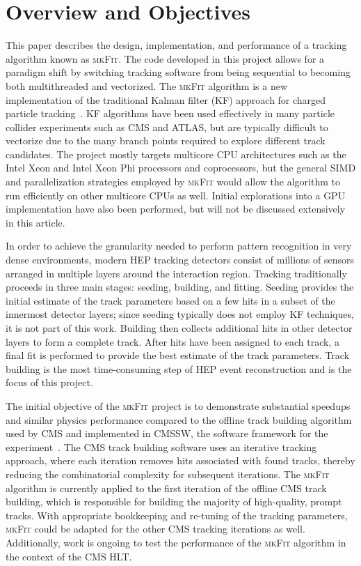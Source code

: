 \documentclass[a4paper,11pt]{article}
\newcommand{\mkFit}{\textsc{mkFit}\xspace}
\newcommand{\Intel}{Intel\textregistered\xspace}
\newcommand{\Xeon}{Xeon\textregistered\xspace}
\newcommand{\XeonPhi}{Xeon Phi\texttrademark\xspace}
\begin{document}

\section{Overview and Objectives}

This paper describes the design, implementation, and performance of a tracking algorithm known as \mkFit. 
The code developed in this project %
allows for a paradigm shift by switching tracking software from being sequential to becoming both multithreaded and vectorized. 
The \mkFit algorithm is a new implementation of the traditional Kalman filter (KF) approach for charged particle tracking~\cite{Fruhwirth:1987fm}. KF algorithms have been used effectively in many particle collider experiments such as CMS and ATLAS, but are typically difficult to vectorize due to the many branch points required to explore different track candidates.
The project mostly targets multicore CPU architectures such as the \Intel \Xeon and \Intel \XeonPhi processors and coprocessors, but the general SIMD and parallelization strategies employed by \mkFit would allow the algorithm to run efficiently on other multicore CPUs as well. 
Initial explorations into a GPU implementation have also been performed, but will not be discussed extensively in this article.

In order to achieve the granularity needed to perform pattern recognition in very dense environments, modern HEP tracking detectors consist of millions of sensors arranged in multiple layers around the interaction region.
Tracking traditionally proceeds in three main stages: seeding, building, and fitting. Seeding provides the initial estimate of the track parameters based on a few hits in a subset of the innermost detector layers; since seeding typically does not employ KF techniques, it is not part of this work. 
Building then collects additional hits in other detector layers to form a complete track.
After hits have been assigned to each track, a final fit is performed to provide the best estimate of the track parameters. Track building is the most time-consuming step of HEP event reconstruction and is the focus of this project. 

The initial objective of the \mkFit project is to demonstrate substantial speedups and similar physics performance compared to the offline track building algorithm used by CMS and implemented in CMSSW, the software framework for the experiment~\cite{Jones:2006cmssw}.
The CMS track building software uses an iterative tracking approach, where each iteration removes hits associated with found tracks, thereby reducing the combinatorial complexity for subsequent iterations. The \mkFit algorithm is currently applied to the first iteration of the offline CMS track building, which is responsible for building the majority of high-quality, prompt tracks. With appropriate bookkeeping and re-tuning of the tracking parameters, \mkFit could be adapted for the other CMS tracking iterations as well. Additionally, work is ongoing to test the performance of the \mkFit algorithm in the context of the CMS HLT.
\end{document}

